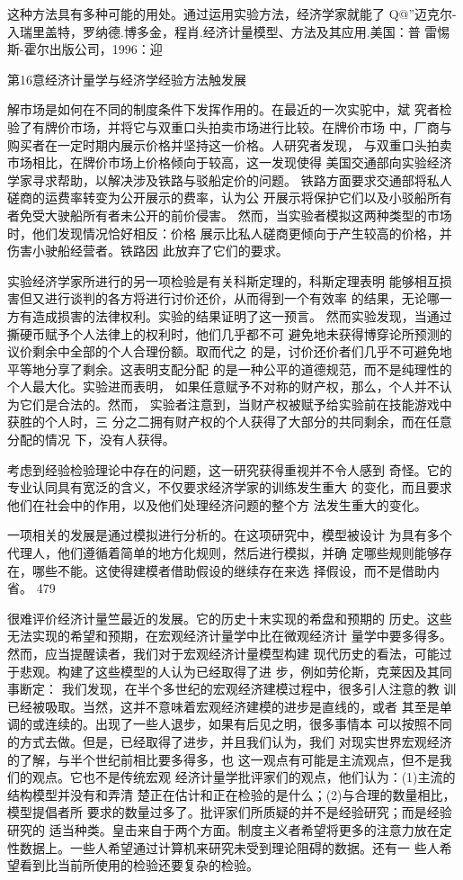 这种方法具有多种可能的用处。通过运用实验方法，经济学家就能了
Q@”迈克尔-入瑞里盖特，罗纳德.博多金，程肖.经济计量模型、方法及其应用.美国：普
雷惕斯-霍尔出版公司，1996：迎

第16意经济计量学与经济学经验方法触发展

解市场是如何在不同的制度条件下发挥作用的。在最近的一次实驼中，斌
究者检验了有牌价市场，并将它与双重口头拍卖市场进行比较。在牌价市场
中，厂商与购买者在一定时期内展示价格并坚持这一价格。人研究者发现，
与双重口头拍卖市场相比，在牌价市场上价格倾向于较高，这一发现使得
美国交通部向实验经济学家寻求帮助，以解决涉及铁路与驳船定价的问题。
铁路方面要求交通部将私人磋商的运费率转变为公开展示的费率，认为公
开展示将保护它们以及小驳船所有者免受大驶船所有者未公开的前价侵害。
然而，当实验者模拟这两种类型的市场时，他们发现情况恰好相反：价格
展示比私人磋商更倾向于产生较高的价格，并伤害小驶船经营者。铁路因
此放弃了它们的要求。

实验经济学家所进行的另一项检验是有关科斯定理的，科斯定理表明
能够相互损害但又进行谈判的各方将进行讨价还价，从而得到一个有效率
的结果，无论哪一方有造成损害的法律权利。实验的结果证明了这一预言。
然而实验发现，当通过撕硬币赋予个人法律上的权利时，他们几乎都不可
避免地未获得博穿论所预测的议价剩余中全部的个人合理份额。取而代之
的是，讨价还价者们几乎不可避免地平等地分享了剩余。这表明支配分配
的是一种公平的道德规范，而不是纯理性的个人最大化。实验进而表明，
如果任意赋予不对称的财产权，那么，个人并不认为它们是合法的。然而，
实验者注意到，当财产权被赋予给实验前在技能游戏中获胜的个人时，三
分之二拥有财产权的个人获得了大部分的共同剩余，而在任意分配的情况
下，没有人获得。

考虑到经验检验理论中存在的问题，这一研究获得重视并不令人感到
奇怪。它的专业认同具有宽泛的含义，不仅要求经济学家的训练发生重大
的变化，而且要求他们在社会中的作用，以及他们处理经济问题的整个方
法发生重大的变化。

一项相关的发展是通过模拟进行分析的。在这项研究中，模型被设计
为具有多个代理人，他们遵循着简单的地方化规则，然后进行模拟，并确
定哪些规则能够存在，哪些不能。这使得建模者借助假设的继续存在来选
择假设，而不是借助内省。
479


很难评价经济计量竺最近的发展。它的历史十末实现的希盘和预期的
历史。这些无法实现的希望和预期，在宏观经济计量学中比在微观经济计
量学中要多得多。然而，应当提醒读者，我们对于宏观经济计量模型构建
现代历史的看法，可能过于悲观。构建了这些模型的人认为已经取得了进
步，例如劳伦斯，克莱因及其同事断定：
我们发现，在半个多世纪的宏观经济建模过程中，很多引人注意的教
训已经被吸取。当然，这并不意味着宏观经济建模的进步是直线的，或者
其至是单调的或连续的。出现了一些人退步，如果有后见之明，很多事情本
可以按照不同的方式去做。但是，已经取得了进步，并且我们认为，我们
对现实世界宏观经济的了解，与半个世纪前相比要多得多，也
这一观点有可能是主流观点，但不是我们的观点。它也不是传统宏观
经济计量学批评家们的观点，他们认为：(1)主流的结构模型并没有和弄清
楚正在估计和正在检验的是什么；(2)与合理的数量相比，模型提倡者所
要求的数量过多了。批评家们所质疑的并不是经验研究；而是经验研究的
适当种类。皇击来自于两个方面。制度主义者希望将更多的注意力放在定
性数据上。一些人希望通过计算机来研究未受到理论阻碍的数据。还有一
些人希望看到比当前所使用的检验还要复杂的检验。

